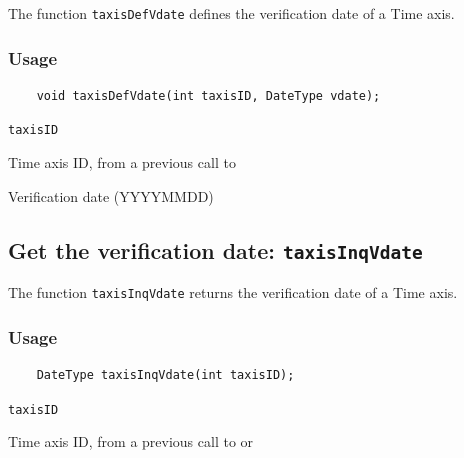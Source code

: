 The function {\texttt{taxisDefVdate}} defines the verification date of a Time axis.

\subsubsection*{Usage}

\begin{verbatim}
    void taxisDefVdate(int taxisID, DateType vdate);
\end{verbatim}

\hspace*{4mm}\begin{minipage}[]{15cm}
\begin{deflist}{\texttt{taxisID}\ }
\item[\texttt{taxisID}]
Time axis ID, from a previous call to {}
\item[\texttt{vdate}]
Verification date (YYYYMMDD)

\end{deflist}
\end{minipage}


\subsection{Get the verification date: \texttt{taxisInqVdate}}
\label{taxisInqVdate}

The function {\texttt{taxisInqVdate}} returns the verification date of a Time axis.

\subsubsection*{Usage}

\begin{verbatim}
    DateType taxisInqVdate(int taxisID);
\end{verbatim}

\hspace*{4mm}\begin{minipage}[]{15cm}
\begin{deflist}{\texttt{taxisID}\ }
\item[\texttt{taxisID}]
Time axis ID, from a previous call to {} or {}

\end{deflist}
\end{minipage}

